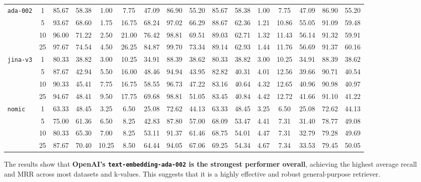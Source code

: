 {\begin{minipage}{\dimexpr\textwidth+6cm\relax}
\begin{longtable}{|l|c|cccccc|c|cccccc|c|}
      \texttt{ada-002} 
      & 1 & 85.67 & 58.38 & 1.00 & 7.75 & 47.09 & 86.90 & 55.20 & 85.67 & 58.38 & 1.00 & 7.75 & 47.09 & 86.90 & 55.20 \\
      & 5 & 93.67 & 68.60 & 1.75 & 16.75 & 68.24 & 97.02 & 66.29 & 88.67 & 62.36 & 1.21 & 10.86 & 55.05 & 91.09 & 59.48 \\
      & 10 & 96.00 & 71.22 & 2.50 & 21.00 & 76.42 & 98.81 & 69.51 & 89.03 & 62.71 & 1.32 & 11.43 & 56.14 & 91.32 & 59.91 \\
      & 25 & 97.67 & 74.54 & 4.50 & 26.25 & 84.87 & 99.70 & 73.34 & 89.14 & 62.93 & 1.44 & 11.76 & 56.69 & 91.37 & 60.16 \\
      \hline
      \texttt{jina-v3} 
      & 1 & 80.33 & 38.82 & 3.00 & 10.25 & 34.91 & 88.39 & 38.62 & 80.33 & 38.82 & 3.00 & 10.25 & 34.91 & 88.39 & 38.62 \\
      & 5 & 87.67 & 42.94 & 5.50 & 16.00 & 48.46 & 94.94 & 43.95 & 82.82 & 40.31 & 4.01 & 12.56 & 39.66 & 90.71 & 40.54 \\
      & 10 & 90.33 & 45.41 & 7.75 & 16.75 & 58.55 & 96.73 & 47.22 & 83.16 & 40.64 & 4.32 & 12.65 & 40.96 & 90.98 & 40.97 \\
      & 25 & 94.67 & 48.41 & 9.50 & 17.75 & 69.68 & 98.81 & 51.05 & 83.45 & 40.84 & 4.42 & 12.72 & 41.66 & 91.10 & 41.22 \\
      \hline
      \texttt{nomic} 
      & 1 & 63.33 & 48.45 & 3.25 & 6.50 & 25.08 & 72.62 & 44.13 & 63.33 & 48.45 & 3.25 & 6.50 & 25.08 & 72.62 & 44.13 \\
      & 5 & 75.00 & 61.36 & 6.50 & 8.25 & 42.83 & 87.80 & 57.00 & 68.09 & 53.47 & 4.41 & 7.31 & 31.40 & 78.77 & 49.08 \\
      & 10 & 80.33 & 65.30 & 7.00 & 8.25 & 53.11 & 91.37 & 61.46 & 68.75 & 54.01 & 4.47 & 7.31 & 32.79 & 79.28 & 49.69 \\
      & 25 & 87.67 & 70.40 & 10.25 & 8.50 & 64.44 & 94.05 & 67.06 & 69.25 & 54.34 & 4.67 & 7.34 & 33.53 & 79.45 & 50.05 \\
      \bottomrule
    \end{longtable}
  \end{minipage}%
}
\vspace*{\fill}\par

The results show that \textbf{OpenAI's \texttt{text-embedding-ada-002} is the strongest performer overall}, achieving the highest average recall and MRR across most datasets and k-values. This suggests that it is a highly effective and robust general-purpose retriever.

